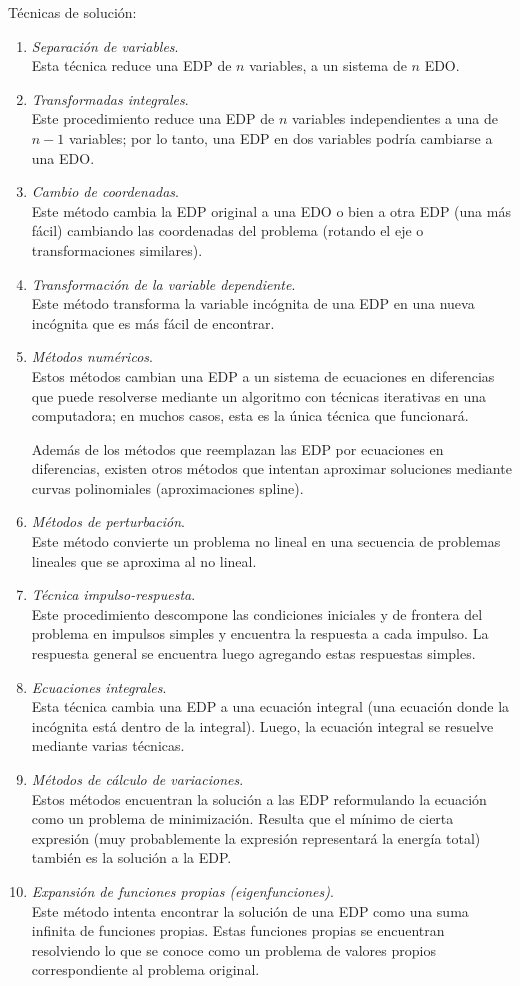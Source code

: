 Técnicas de solución:
\begin{enumerate}
\item \emph{Separación de variables}.
\\
Esta técnica reduce una EDP de $n$ variables, a un sistema de $n$ EDO.
\item \emph{Transformadas integrales}.
\\
Este procedimiento reduce una EDP de $n$ variables independientes a una de $n - 1$ variables; por lo tanto, una EDP en dos variables podría cambiarse a una EDO.
\item \emph{Cambio de coordenadas}.
\\
Este método cambia la EDP original a una EDO o bien a otra EDP (una más fácil) cambiando las coordenadas del problema (rotando el eje o transformaciones similares).
\item \emph{Transformación de la variable dependiente}.
\\
Este método transforma la variable incógnita de una EDP en una nueva incógnita que es más fácil de encontrar.
\item \emph{Métodos numéricos}. 
\\
Estos métodos cambian una EDP a un sistema de ecuaciones en diferencias que puede resolverse mediante un algoritmo con técnicas iterativas en una computadora; en muchos casos, esta es la única técnica que funcionará. 
\par
Además de los métodos que reemplazan las EDP por ecuaciones en diferencias, existen otros métodos que intentan aproximar soluciones mediante curvas polinomiales (aproximaciones spline).
\item \emph{Métodos de perturbación}.
\\
Este método convierte un problema no lineal en una secuencia de problemas lineales que se aproxima al no lineal.
\item \emph{Técnica impulso-respuesta}.
\\
Este procedimiento descompone las condiciones iniciales y de frontera del problema en impulsos simples y encuentra la respuesta a cada impulso. La respuesta general se encuentra luego agregando estas respuestas simples.
\item \emph{Ecuaciones integrales}.
\\
Esta técnica cambia una EDP a una ecuación integral (una ecuación donde la incógnita está dentro de la integral). Luego, la ecuación integral se resuelve mediante varias técnicas.
\item \emph{Métodos de cálculo de variaciones}.
\\
Estos métodos encuentran la solución a las EDP reformulando la ecuación como un problema de minimización. Resulta que el mínimo de cierta expresión (muy probablemente la expresión representará la energía total) también es la solución a la EDP.
\item \emph{Expansión de funciones propias (eigenfunciones)}.
\\
Este método intenta encontrar la solución de una EDP como una suma infinita de funciones propias. Estas funciones propias se encuentran resolviendo lo que se conoce como un problema de valores propios correspondiente al problema original.
\end{enumerate}

